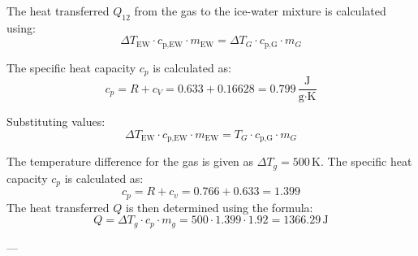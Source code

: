 The heat transferred \( Q_{12} \) from the gas to the ice-water mixture is calculated using:  
\[
\Delta T_{\text{EW}} \cdot c_{\text{p,EW}} \cdot m_{\text{EW}} = \Delta T_G \cdot c_{\text{p,G}} \cdot m_G
\]  

The specific heat capacity \( c_p \) is calculated as:  
\[
c_p = R + c_V = 0.633 + 0.16628 = 0.799 \, \frac{\text{J}}{\text{g·K}}
\]  

Substituting values:  
\[
\Delta T_{\text{EW}} \cdot c_{\text{p,EW}} \cdot m_{\text{EW}} = T_G \cdot c_{\text{p,G}} \cdot m_G
\]

The temperature difference for the gas is given as \( \Delta T_g = 500 \, \text{K} \). The specific heat capacity \( c_p \) is calculated as:  
\[
c_p = R + c_v = 0.766 + 0.633 = 1.399
\]  
The heat transferred \( Q \) is then determined using the formula:  
\[
Q = \Delta T_g \cdot c_p \cdot m_g = 500 \cdot 1.399 \cdot 1.92 = 1366.29 \, \text{J}
\]  

---